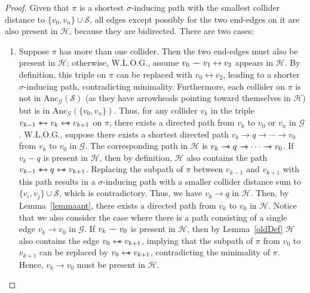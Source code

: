 \documentclass[accepted]{uai2025} %
\newcommand{\anc}{\text{Anc}}
\newcommand{\huh}{\mathrel{\leftrightarrow}}
\newcommand{\hus}{\mathrel{{\leftarrow\mkern-11mu\ast}}}
\newcommand{\suh}{\mathrel{{\ast\mkern-11mu\to}}}
\newcommand{\tus}{\mathrel{{\relbar\mkern-11mu\relbar\mkern-11mu\ast}}}
\newcommand{\tut}{\mathrel{{\relbar\mkern-9mu\relbar}}}
\begin{document}
\begin{proof}
Given that \( \pi \) is a shortest \( \sigma \)-inducing path with the smallest collider distance to \( \{v_0, v_n\} \cup \mathcal{S} \), all edges except possibly for the two end-edges on it are also present in \( \mathcal{H} \), because they are bidirected. There are two cases:

\begin{enumerate}    
    \item Suppose \( \pi \) has more than one collider. Then the two end-edges must also be present in \( \mathcal{H} \); otherwise, W.L.O.G., assume \( v_0 \tut v_1 \huh v_2 \) appears in $\mathcal{H}$. By definition, this triple on $\pi$ can be replaced with \( v_0 \huh v_2 \), leading to a shorter \( \sigma \)-inducing path, contradicting minimality. Furthermore, each collider on \( \pi \) is not in \( \anc_\mathcal{G}(\mathcal{S}) \) (as they have arrowheads pointing toward themselves in \( \mathcal{H} \)) but is in \( \anc_\mathcal{G}(\{v_0, v_n\}) \). Thus, for any collider \( v_k \) in the triple \( v_{k-1} \suh v_k \hus v_{k+1} \) on \( \pi \), there exists a directed path from \( v_k \) to \( v_0 \) or \( v_n \) in \( \mathcal{G} \). W.L.O.G., suppose there exists a shortest directed path \( v_k \rightarrow q \rightarrow \cdots \rightarrow v_0 \) from $v_k$ to $v_0$ in \( \mathcal{G} \). The corresponding path in \( \mathcal{H} \) is \( v_k \tus q \tus \cdots \tus v_0 \). If \( v_k - q \) is present in \( \mathcal{H} \), then by definition, \( \mathcal{H} \) also contains the path \( v_{k-1}\suh q \hus v_{k+1} \). Replacing the subpath of \( \pi \) between \( v_{k-1} \) and \( v_{k+1} \) with this path results in a \( \sigma \)-inducing path with a smaller collider distance sum to \( \{v_i, v_j\} \cup \mathcal{S} \), which is contradictory. Thus, we have \( v_k \rightarrow q \) in \( \mathcal{H} \). Then, by Lemma~\ref{lemmaant}, there exists a directed path from \( v_k \) to \( v_0 \) in \( \mathcal{H} \). Notice that we also consider the case where there is a path consisting of a single edge \( v_k \rightarrow v_0 \) in \( \mathcal{G} \). If \( v_k \tut v_0 \) is present in \( \mathcal{H} \), then by Lemma~\ref{oldDef} $\mathcal{H}$ also contains the edge $v_0\hus v_{k+1}$, implying that the subpath of \( \pi \) from \( v_0 \) to \( v_{k+1} \) can be replaced by \( v_0 \hus v_{k+1} \), contradicting the minimality of \( \pi \). Hence, \( v_k \rightarrow v_0 \) must be present in \( \mathcal{H} \).


\end{enumerate}
\end{proof}
\end{document}
